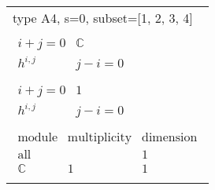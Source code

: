 \documentclass[crop,border=2mm]{standalone}
\begin{document}
\begin{tabular}{l}
{\huge type A4, s=0, subset=[1, 2, 3, 4]}\\ \\


$\displaystyle
\begin{array}{r|l}
	{\scriptstyle i+j=0}&\mathbb{C}\\
	\hline h^{i,j}&{\scriptstyle j-i=0}
\end{array}
$ \\ \\


$\displaystyle
\begin{array}{r|l}
	{\scriptstyle i+j=0}&1\\
	\hline h^{i,j}&{\scriptstyle j-i=0}
\end{array}
$ \\ \\


$\displaystyle
\begin{array}{rll}
	\text{module}&\text{multiplicity}&\text{dimension} \\ \hline \text{all}&&1 \\
	\mathbb{C}&1&1
\end{array}
$ \\ \\

\end{tabular}
\end{document}
